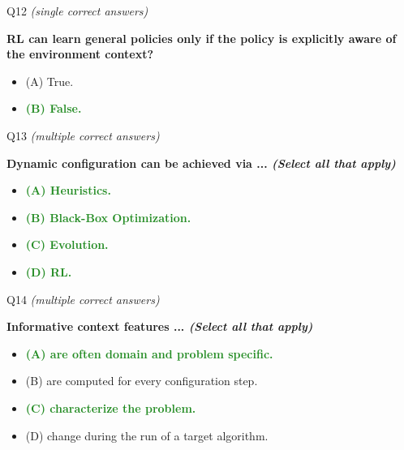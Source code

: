 \documentclass[main]{subfiles}
\newcommand{\correct}[1]{\textcolor{ForestGreen}{\textbf{#1} \checkmark}}
\newcommand{\wrong}[1]{#1}
\begin{document}
\begin{frame}{Q12 \hfill \small\normalfont\textit{(single correct answers)}}

\textbf{RL can learn general policies only if the policy is explicitly aware of the environment context?}

\begin{itemize}
    \item \wrong{(A) \; True.}
    \item \correct{(B) \; False.}
\end{itemize}

\end{frame}

\begin{frame}{Q13 \hfill \small\normalfont\textit{(multiple correct answers)}}

\textbf{Dynamic configuration can be achieved via ... \textit{(Select all that apply)}}

\begin{itemize}
    \item \correct{(A) \; Heuristics.}
    \item \correct{(B) \; Black-Box Optimization.}
    \item \correct{(C) \; Evolution.}
    \item \correct{(D) \; RL.}
\end{itemize}

\end{frame}

\begin{frame}{Q14 \hfill \small\normalfont\textit{(multiple correct answers)}}

\textbf{Informative context features ... \textit{(Select all that apply)}}

\begin{itemize}
    \item \correct{(A) \; are often domain and problem specific.}
    \item \wrong{(B) \; are computed for every configuration step.}
    \item \correct{(C) \; characterize the problem.}
    \item \wrong{(D) \; change during the run of a target algorithm.}
\end{itemize}

\end{frame}
\end{document}
